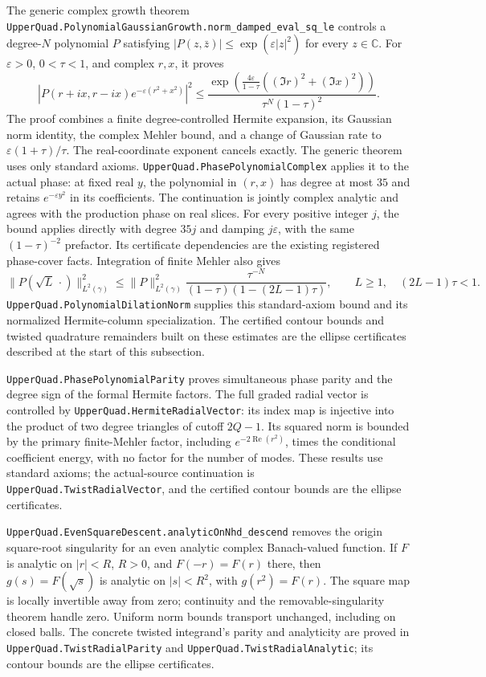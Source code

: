 \documentclass[11pt,a4paper]{article}
\newcommand{\lean}[1]{\texttt{\small #1}}
\begin{document}
The generic complex growth theorem
\lean{UpperQuad.PolynomialGaussianGrowth.norm\_damped\_eval\_sq\_le} controls
a degree-$N$ polynomial $P$ satisfying
$|P(z,\bar z)|\le\exp(\varepsilon|z|^2)$ for every $z\in\mathbb C$.
For $\varepsilon>0$, $0<\tau<1$, and complex $r,x$, it proves
\[
 \left|P(r+ix,r-ix)e^{-\varepsilon(r^2+x^2)}\right|^2
 \le \frac{\exp\!\left(\frac{4\varepsilon}{1-\tau}
       ((\Im r)^2+(\Im x)^2)\right)}{\tau^N(1-\tau)^2}.
\]
The proof combines a finite degree-controlled Hermite expansion, its Gaussian
norm identity, the complex Mehler bound, and a change of Gaussian rate to
$\varepsilon(1+\tau)/\tau$. The real-coordinate exponent cancels exactly.
The generic theorem uses only standard axioms.
\lean{UpperQuad.PhasePolynomialComplex} applies it to the actual phase:
at fixed real $y$, the polynomial in $(r,x)$ has degree at most $35$ and retains
$e^{-\varepsilon y^2}$ in its coefficients. The continuation is jointly complex
analytic and agrees with the production phase on real slices. For every positive
integer $j$, the bound applies directly with degree $35j$ and damping
$j\varepsilon$, with the same $(1-\tau)^{-2}$ prefactor. Its certificate
dependencies are the existing registered phase-cover facts.
Integration of finite Mehler also gives
\[
 \|P(\sqrt L\,\cdot)\|_{L^2(\gamma)}^2
 \le \|P\|_{L^2(\gamma)}^2
       \frac{\tau^{-N}}{(1-\tau)(1-(2L-1)\tau)},
 \qquad L\ge1,\quad (2L-1)\tau<1.
\]
\lean{UpperQuad.PolynomialDilationNorm} supplies this standard-axiom bound and
its normalized Hermite-column specialization. The certified contour bounds and
twisted quadrature remainders built on these estimates are the ellipse
certificates described at the start of this subsection.

\lean{UpperQuad.PhasePolynomialParity} proves simultaneous phase parity and
the degree sign of the formal Hermite factors. The full graded radial vector
is controlled by \lean{UpperQuad.HermiteRadialVector}: its index map is
injective into the product of two degree triangles of cutoff $2Q-1$.
Its squared norm is bounded by the primary finite-Mehler factor, including
$e^{-2\operatorname{Re}(r^2)}$, times the conditional coefficient energy,
with no factor for the number of modes. These results use standard axioms;
the actual-source continuation is \lean{UpperQuad.TwistRadialVector}, and the
certified contour bounds are the ellipse certificates.

\lean{UpperQuad.EvenSquareDescent.analyticOnNhd\_descend} removes the origin
square-root singularity for an even analytic complex Banach-valued function.
If $F$ is analytic on $|r|<R$, $R>0$, and $F(-r)=F(r)$ there, then
$g(s)=F(\sqrt{s})$ is analytic on $|s|<R^2$, with $g(r^2)=F(r)$.
The square map is locally invertible away from zero; continuity and the
removable-singularity theorem handle zero. Uniform norm bounds transport
unchanged, including on closed balls. The concrete twisted integrand's parity
and analyticity are proved in \lean{UpperQuad.TwistRadialParity} and
\lean{UpperQuad.TwistRadialAnalytic}; its contour bounds are the ellipse
certificates.
\end{document}
